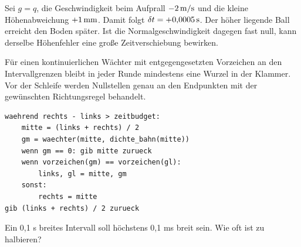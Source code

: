 Sei \(g=q\), die Geschwindigkeit beim Aufprall \(-2\,\mathrm{m/s}\) und die kleine Höhenabweichung \(+1\,\mathrm{mm}\). Damit folgt \(\delta t=+0{,}0005\,\mathrm{s}\). Der höher liegende Ball erreicht den Boden später. Ist die Normalgeschwindigkeit dagegen fast null, kann derselbe Höhenfehler eine große Zeitverschiebung bewirken.

Für einen kontinuierlichen Wächter mit entgegengesetzten Vorzeichen an den Intervallgrenzen bleibt in jeder Runde mindestens eine Wurzel in der Klammer. Vor der Schleife werden Nullstellen genau an den Endpunkten mit der gewünschten Richtungsregel behandelt.
{\small\begin{verbatim}
waehrend rechts - links > zeitbudget:
    mitte = (links + rechts) / 2
    gm = waechter(mitte, dichte_bahn(mitte))
    wenn gm == 0: gib mitte zurueck
    wenn vorzeichen(gm) == vorzeichen(gl):
        links, gl = mitte, gm
    sonst:
        rechts = mitte
gib (links + rechts) / 2 zurueck
\end{verbatim}}
Ein 0,1 s breites Intervall soll höchstens 0,1 ms breit sein. Wie oft ist zu halbieren?

